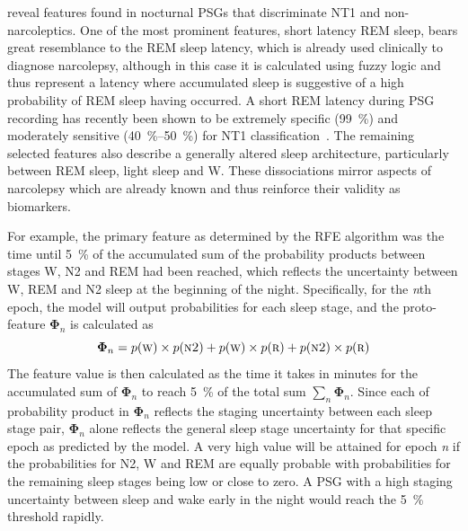  reveal features found in nocturnal \acp{PSG} that discriminate \ac{NT1} and non-narcoleptics. 
One of the most prominent features, short latency \ac{REM} sleep, bears great resemblance to the \ac{REM} sleep latency, which is already used clinically to diagnose narcolepsy, although in this case it is calculated using fuzzy logic and thus represent a latency where accumulated sleep is suggestive of a high probability of \ac{REM} sleep having occurred. 
A short \ac{REM} latency during \ac{PSG} recording has recently been shown to be extremely specific (\SI{99}{\percent}) and moderately sensitive (\SIrange{40}{50}{\percent}) for \ac{NT1} classification~\cite{Andlauer2013,Reiter2015}. 
The remaining selected features also describe a generally altered sleep architecture, particularly between \ac{REM} sleep, light sleep and \ac{W}.
These dissociations mirror aspects of narcolepsy which are already known and thus reinforce their validity as biomarkers.

For example, the primary feature as determined by the \ac{RFE} algorithm was the time until \SI{5}{\percent} of the accumulated sum of the probability products between stages \ac{W}, \ac{N2} and \ac{REM} had been reached, which reflects the uncertainty between \ac{W}, \ac{REM} and \ac{N2} sleep at the beginning of the night. 
Specifically, for the \textit{n}th epoch, the model will output probabilities for each sleep stage, and the proto-feature \( \boldsymbol{\Phi}_n \) is calculated as
\begin{equation}
    \boldsymbol{\Phi}_n = p \! \left( \textsc{w} \right) \times p \! \left( \textsc{n2} \right) + p \! \left( \textsc{w} \right) \times p \! \left( \textsc{r} \right) + p \! \left( \textsc{n2} \right) \times p \! \left( \textsc{r} \right)
\end{equation}
The feature value is then calculated as the time it takes in minutes for the accumulated sum of \( \boldsymbol{\Phi}_n \) to reach \SI{5}{\percent} of the total sum \( \sum_n \boldsymbol{\Phi}_n \). 
Since each of probability product in \( \boldsymbol{\Phi}_n \) reflects the staging uncertainty between each sleep stage pair, \( \boldsymbol{\Phi}_n \) alone reflects the general sleep stage uncertainty for that specific epoch as predicted by the model. 
A very high value will be attained for epoch \textit{n} if the probabilities for \ac{N2}, \ac{W} and \ac{REM} are equally probable with probabilities for the remaining sleep stages being low or close to zero. 
A \ac{PSG} with a high staging uncertainty between sleep and wake early in the night would reach the \SI{5}{\percent} threshold rapidly.

